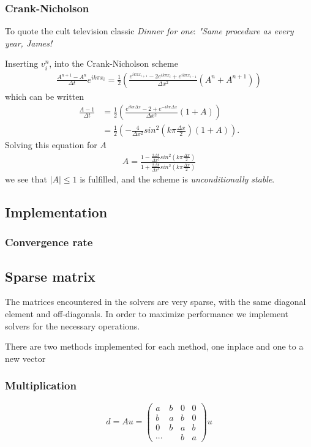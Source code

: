 \documentclass[11pt,a4paper,draft]{article}
\numberwithin{equation}{section}
\begin{document}
\subsubsection{Crank-Nicholson}
To quote the cult television classic \emph{Dinner for one}:  \emph{"Same procedure as every year, James!}

Inserting  $v^n_i$, into the Crank-Nicholson scheme
\begin{align*}
\frac{A^{n+1} - A^{n}}{\Delta t} e^{ik \pi x_i} = \frac{1}{2} \left( \frac{e^{ik \pi x_{i+1}}-2e^{ik \pi x_{i}} + e^{ik \pi x_{i-1}}}{\Delta x^2} (A^n + A^{n+1})  \right)
\end{align*}
which can be written 
\begin{align*}
\frac{A-1}{\Delta t} &= \frac{1}{2} \left( \frac{e^{ik \pi \Delta x} -2 + e^{-ik \pi \Delta x}}{\Delta x^2} (1 + A) \right) \\
&= \frac{1}{2} \left( -\frac{4}{\Delta x^2}sin^2\left(k\pi \frac{\Delta x}{2}\right)(1 + A) \right).
\end{align*}
Solving this equation for $A$
\begin{align*}
A = \frac{1-\frac{2\Delta t}{\Delta x^2}sin^2\left(k\pi \frac{\Delta x}{2}\right)}{1+\frac{2\Delta t}{\Delta x^2}sin^2\left(k\pi \frac{\Delta x}{2}\right)}
\end{align*}
we see that $|A| \leq 1$ is fulfilled, and the scheme is  \emph{unconditionally stable}.


\subsection{Implementation}

\subsubsection{Convergence rate}

\subsection{Sparse matrix}
The matrices encountered in the solvers are very sparse, with the same 
diagonal element and off-diagonals. In order to maximize performance 
we implement solvers for the necessary operations.

There are two methods implemented for each method, one inplace and one 
to a new vector

\subsubsection{Multiplication}
\begin{equation}
d = Au =
\begin{pmatrix}
a & b & 0 & 0\\
b & a & b & 0\\
0 & b & a & b\\
\cdots & & b & a
\end{pmatrix}u
\end{equation}
\end{document}
